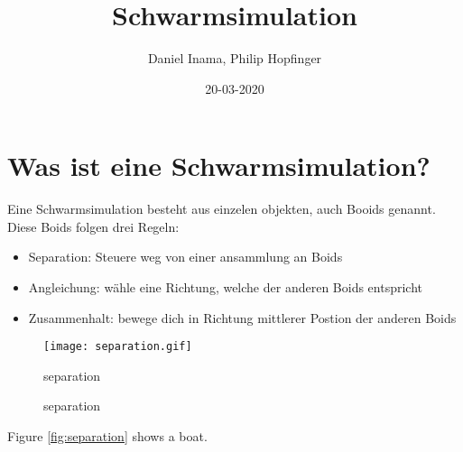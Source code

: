 \documentclass{article}
\title{Schwarmsimulation}
\date{20-03-2020}
\author{Daniel Inama, Philip Hopfinger}
\begin{document}
\maketitle
\newpage

\section{Was ist eine Schwarmsimulation?}
Eine Schwarmsimulation besteht aus einzelen objekten, auch Booids genannt. Diese Boids folgen drei Regeln: 
\begin{itemize}
	\item Separation: Steuere weg von einer ansammlung an Boids
	\item Angleichung: wähle eine Richtung, welche der anderen Boids entspricht
	\item Zusammenhalt: bewege dich in Richtung mittlerer Postion der anderen Boids
\end{itemize}
\begin{figure}
	\texttt{[image: separation.gif]}
	\caption{separation}
\label{}{separation}
\end{figure}


Figure \ref{fig:separation} shows a boat.
\end{document}
